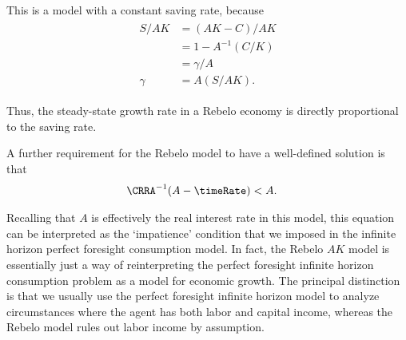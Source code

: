 \documentclass{handout}
\begin{document}
This is a model with a constant saving rate, because
\begin{equation}\begin{gathered}\begin{aligned}
  \label{eq:2}
  S/AK & =  (AK - C)/AK
\\ & =  1 - A^{-1} (C/K)
\\ & =  \gamma/A
\\ \gamma & =  A (S/AK).
\end{aligned}\end{gathered}\end{equation}

Thus, the steady-state growth rate in a Rebelo economy is 
directly proportional to the saving rate.  

A further requirement for the Rebelo model to have a well-defined
solution is that 
\begin{equation}\begin{gathered}\begin{aligned}
  \label{eq:impatience}
  \CRRA^{-1}(A-\timeRate) & <  A.
\end{aligned}\end{gathered}\end{equation}

Recalling that $A$ is effectively the real interest rate 
in this model, this equation can be interpreted as the 
`impatience' condition that we imposed in the infinite 
horizon perfect foresight consumption model.  In fact, 
the Rebelo $AK$ model is essentially just a way of 
reinterpreting the perfect foresight infinite horizon
consumption problem as a model for economic growth.
The principal distinction is that we usually use the
perfect foresight infinite horizon model to analyze 
circumstances where the agent has both labor and 
capital income, whereas the Rebelo model rules out
labor income by assumption.

%

 

\end{document}

